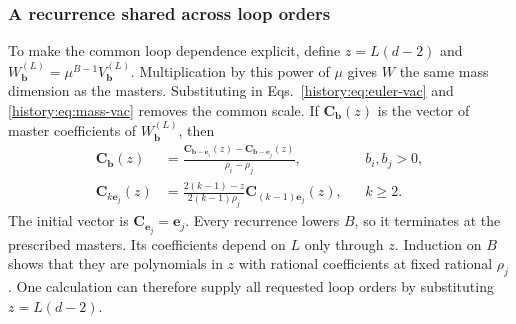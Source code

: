 \subsubsection{A recurrence shared across loop orders}
To make the common loop dependence explicit, define $z=L(d-2)$ and $W_{\boldsymbol b}^{(L)}=\mu^{B-1}V_{\boldsymbol b}^{(L)}$. Multiplication by this power of $\mu$ gives $W$ the same mass dimension as the masters. Substituting in Eqs.~\eqref{history:eq:euler-vac} and \eqref{history:eq:mass-vac} removes the common scale. If $\boldsymbol C_{\boldsymbol b}(z)$ is the vector of master coefficients of $W_{\boldsymbol b}^{(L)}$, then
\begin{align}
 \boldsymbol C_{\boldsymbol b}(z)
 &=\frac{\boldsymbol C_{\boldsymbol b-\boldsymbol e_i}(z)
          -\boldsymbol C_{\boldsymbol b-\boldsymbol e_j}(z)}{\rho_i-\rho_j},
       &&b_i,b_j>0,\label{history:eq:mass-rec}\\
 \boldsymbol C_{k\boldsymbol e_j}(z)
 &=\frac{2(k-1)-z}{2(k-1)\rho_j}
         \boldsymbol C_{(k-1)\boldsymbol e_j}(z),
       &&k\geq2.\label{history:eq:euler-rec}
\end{align}
The initial vector is $\boldsymbol C_{\boldsymbol e_j}=\boldsymbol e_j$. Every recurrence lowers $B$, so it terminates at the prescribed masters. Its coefficients depend on $L$ only through $z$. Induction on $B$ shows that they are polynomials in $z$ with rational coefficients at fixed rational $\rho_j$. One calculation can therefore supply all requested loop orders by substituting $z=L(d-2)$.

